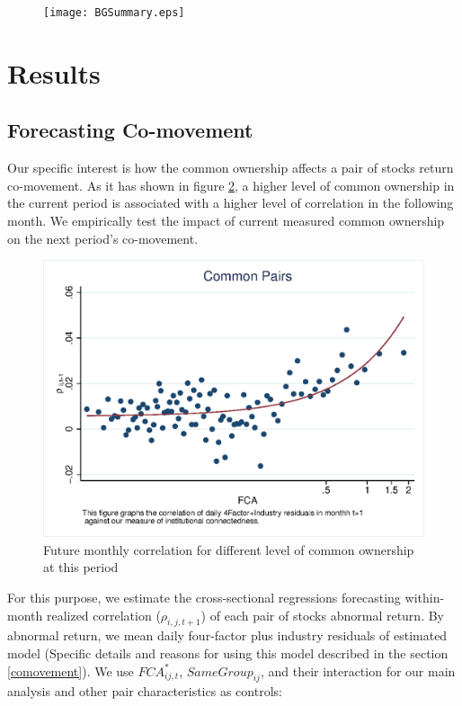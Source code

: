 \documentclass[12pt, a4paper]{article}
\begin{document}
\begin{figure}[htbp]
	\caption{}
	\label{BGSummary}
	\centering
	\texttt{[image: BGSummary.eps]}
\end{figure}
\FloatBarrier




\section{Results}

\subsection{Forecasting Co-movement}

Our specific interest is how the common ownership affects a pair of stocks return co-movement. As it has shown in figure \ref{mcorr50}, a higher level of common ownership in the current period is associated with a higher level of correlation in the following month. We empirically test the impact of current measured common ownership on the next period's co-movement.

 \begin{figure}[htbp]
 \centering  
        \centering
        \includegraphics[width=0.75\linewidth]{"Output/mcorr50.eps"} 
    \caption{Future monthly correlation for different level of common ownership at this period }
    \label{mcorr50}
\end{figure}

For this purpose, we estimate the cross-sectional regressions forecasting within-month realized correlation ($\rho_{i,j,t+1}$) of each pair of stocks abnormal return. By abnormal return, we mean daily four-factor plus industry residuals of estimated model (Specific details and reasons for using this model described in the section \ref{comovement}). We use $\textit{FCA}^*_{ij,t}$, $\textit{SameGroup}_{ij} $, and their interaction for our main analysis and other pair characteristics as controls:

\end{document}
